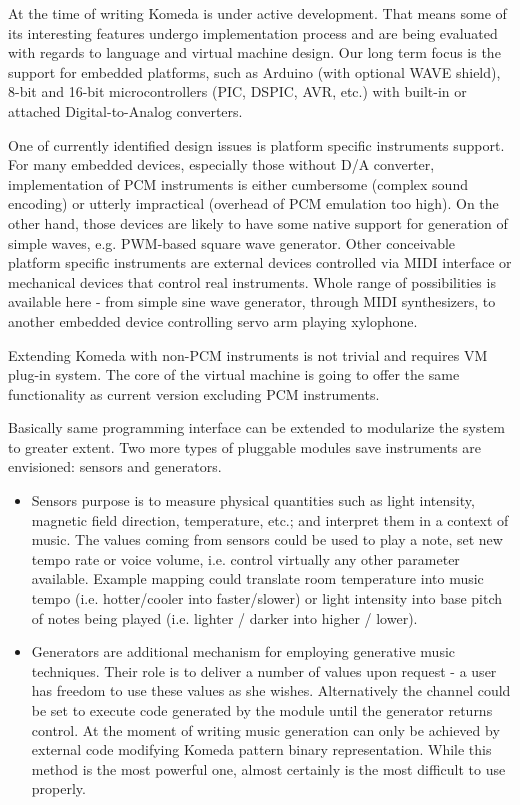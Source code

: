 \documentclass{article}
\begin{document}
At the time of writing Komeda is under active development. That means some of
its interesting features undergo implementation process and are being evaluated
with regards to language and virtual machine design. Our long term focus is the
support for embedded platforms, such as Arduino (with optional WAVE shield),
8-bit and 16-bit microcontrollers (PIC, DSPIC, AVR, etc.) with built-in or
attached Digital-to-Analog converters.

One of currently identified design issues is platform specific instruments
support. For many embedded devices, especially those without D/A converter,
implementation of PCM instruments is either cumbersome (complex sound encoding)
or utterly impractical (overhead of PCM emulation too high). On the other hand,
those devices are likely to have some native support for generation of simple
waves, e.g. PWM-based square wave generator. Other conceivable platform
specific instruments are external devices controlled via MIDI interface or
mechanical devices that control real instruments. Whole range of possibilities
is available here - from simple sine wave generator, through MIDI synthesizers,
to another embedded device controlling servo arm playing xylophone.

Extending Komeda with non-PCM instruments is not trivial and requires VM
plug-in system. The core of the virtual machine is going to offer the same
functionality as current version excluding PCM instruments. 

Basically same programming interface can be extended to modularize the system
to greater extent.  Two more types of pluggable modules save instruments are
envisioned: sensors and generators.

\begin{itemize}
  \item Sensors purpose is to measure physical quantities such as light
    intensity, magnetic field direction, temperature, etc.; and interpret them
    in a context of music. The values coming from sensors could be used to play
    a note, set new tempo rate or voice volume, i.e. control virtually any
    other parameter available. Example mapping could translate room temperature
    into music tempo (i.e. hotter/cooler into faster/slower) or light intensity
    into base pitch of notes being played (i.e. lighter / darker into higher /
    lower).

  \item Generators are additional mechanism for employing generative music
    techniques. Their role is to deliver a number of values upon request - a
    user has freedom to use these values as she wishes. Alternatively the
    channel could be set to execute code generated by the module until the
    generator returns control. At the moment of writing music generation can
    only be achieved by external code modifying Komeda pattern binary
    representation. While this method is the most powerful one, almost
    certainly is the most difficult to use properly. 
\end{itemize}
\end{document}
